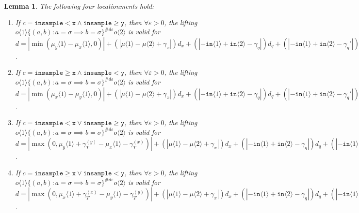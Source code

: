 \documentclass[12pt]{article}
\newcommand{\gguard}[1][x]{\texttt{insample}\geq#1}
\newcommand{\lguard}[1][x]{\texttt{insample} < #1}
\newcommand{\brangle}[1]{\langle#1 \rangle}
\newtheorem{lemma}[thm]{Lemma}
\theoremstyle{definition}
\begin{document}
\begin{lemma}
    The following four locationments hold:\begin{enumerate}
        \item If $c = \lguard[\texttt{x}] \land \gguard[\texttt{y}]$, then $\forall \varepsilon>0$, the lifting $o\brangle{1}\{(a, b): a=\sigma\implies b=\sigma\}^{\#d\varepsilon}o\brangle{2}$ is valid for $d = |\min(\mu_y\brangle{1}-\mu_x\brangle{1}, 0)|+(|\mu\brangle{1}-\mu\brangle{2}+\gamma_x|)d_x+(|-\texttt{in}\brangle{1}+\texttt{in}\brangle{2}-\gamma_q|)d_q+(|-\texttt{in}\brangle{1}+\texttt{in}\brangle{2}-\gamma_q'|)d_q'$. 
        \item If $c = \gguard[\texttt{x}] \land \lguard[\texttt{y}]$, then $\forall \varepsilon>0$, the lifting $o\brangle{1}\{(a, b): a=\sigma\implies b=\sigma\}^{\#d\varepsilon}o\brangle{2}$ is valid for $d = |\min(\mu_x\brangle{1}-\mu_y\brangle{1}, 0)|+(|\mu\brangle{1}-\mu\brangle{2}+\gamma_x|)d_x+(|-\texttt{in}\brangle{1}+\texttt{in}\brangle{2}-\gamma_q|)d_q+(|-\texttt{in}\brangle{1}+\texttt{in}\brangle{2}-\gamma_q'|)d_q'$. 
        \item If $c = \lguard[\texttt{x}] \lor \gguard[\texttt{y}]$, then $\forall \varepsilon>0$, the lifting $o\brangle{1}\{(a, b): a=\sigma\implies b=\sigma\}^{\#d\varepsilon}o\brangle{2}$ is valid for $d = |\max(0, \mu_y\brangle{1}+ \gamma_T^{(y)}-\mu_x\brangle{1}-\gamma_T^{(x)})|+(|\mu\brangle{1}-\mu\brangle{2}+\gamma_x|)d_x+(|-\texttt{in}\brangle{1}+\texttt{in}\brangle{2}-\gamma_q|)d_q+(|-\texttt{in}\brangle{1}+\texttt{in}\brangle{2}-\gamma_q'|)d_q'$. 
        \item If $c = \gguard[\texttt{x}] \lor \lguard[\texttt{y}]$, then $\forall \varepsilon>0$, the lifting $o\brangle{1}\{(a, b): a=\sigma\implies b=\sigma\}^{\#d\varepsilon}o\brangle{2}$ is valid for $d = |\max(0, \mu_x\brangle{1}+ \gamma_T^{(x)}-\mu_y\brangle{1}-\gamma_T^{(y)})|+(|\mu\brangle{1}-\mu\brangle{2}+\gamma_x|)d_x+(|-\texttt{in}\brangle{1}+\texttt{in}\brangle{2}-\gamma_q|)d_q+(|-\texttt{in}\brangle{1}+\texttt{in}\brangle{2}-\gamma_q'|)d_q'$. 
    \end{enumerate}
\end{lemma}
\end{document}
